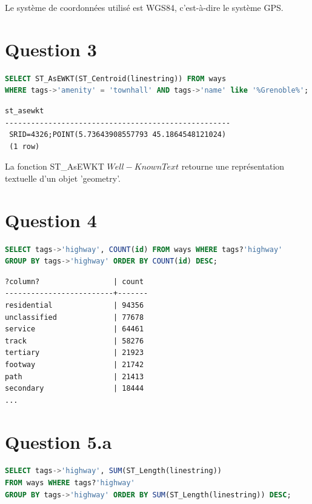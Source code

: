 \documentclass[12pt,a4paper]{article}
\begin{document}
Le système de coordonnées utilisé est WGS84, c'est-à-dire le système GPS.

\vspace{1cm}
\section*{Question 3}

\begin{lstlisting}[language=SQL]
SELECT ST_AsEWKT(ST_Centroid(linestring)) FROM ways
WHERE tags->'amenity' = 'townhall' AND tags->'name' like '%Grenoble%';
\end{lstlisting}

\begin{lstlisting}
st_asewkt                      
----------------------------------------------------
 SRID=4326;POINT(5.73643908557793 45.1864548121024)
 (1 row)
\end{lstlisting}

La fonction ST\_AsEWKT \(Well-Known Text\) retourne une représentation textuelle d'un objet 'geometry'.

\vspace{1cm}
\section*{Question 4}

\begin{lstlisting}[language=SQL]
SELECT tags->'highway', COUNT(id) FROM ways WHERE tags?'highway'
GROUP BY tags->'highway' ORDER BY COUNT(id) DESC;
\end{lstlisting}

\begin{lstlisting}
?column?                 | count 
-------------------------+-------
residential              | 94356
unclassified             | 77678
service                  | 64461
track                    | 58276
tertiary                 | 21923
footway                  | 21742
path                     | 21413
secondary                | 18444
...
\end{lstlisting}

\vspace{1cm}
\section*{Question 5.a}

\begin{lstlisting}[language=SQL]
SELECT tags->'highway', SUM(ST_Length(linestring))
FROM ways WHERE tags?'highway'
GROUP BY tags->'highway' ORDER BY SUM(ST_Length(linestring)) DESC;
\end{lstlisting}
\end{document}
